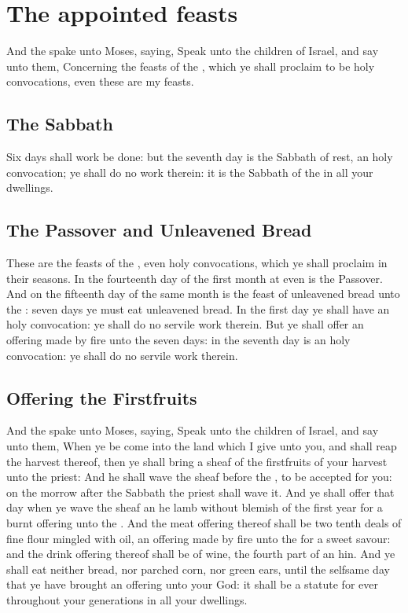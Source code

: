 \section*{The appointed feasts}
\begin{biblechapter} %
\verse And the \LORD spake unto Moses, saying,
\verse Speak unto the children of Israel, and say unto them, Concerning the feasts of the \LORD, which ye shall proclaim to be holy convocations, even these are my feasts.
\subsection*{The Sabbath}
\verse Six days shall work be done: but the seventh day is the Sabbath of rest, an holy convocation; ye shall do no work therein: it is the Sabbath of the \LORD in all your dwellings.
\subsection*{The Passover and Unleavened Bread}
\verse These are the feasts of the \LORD, even holy convocations, which ye shall proclaim in their seasons.
\verse In the fourteenth day of the first month at even is the \LORDs Passover.
\verse And on the fifteenth day of the same month is the feast of unleavened bread unto the \LORD: seven days ye must eat unleavened bread.
\verse In the first day ye shall have an holy convocation: ye shall do no servile work therein.
\verse But ye shall offer an offering made by fire unto the \LORD seven days: in the seventh day is an holy convocation: ye shall do no servile work therein.
\subsection*{Offering the Firstfruits}
\verse And the \LORD spake unto Moses, saying,
\verse Speak unto the children of Israel, and say unto them, When ye be come into the land which I give unto you, and shall reap the harvest thereof, then ye shall bring a sheaf of the firstfruits of your harvest unto the priest:
\verse And he shall wave the sheaf before the \LORD, to be accepted for you: on the morrow after the Sabbath the priest shall wave it.
\verse And ye shall offer that day when ye wave the sheaf an he lamb without blemish of the first year for a burnt offering unto the \LORD.
\verse And the meat offering thereof shall be two tenth deals of fine flour mingled with oil, an offering made by fire unto the \LORD for a sweet savour: and the drink offering thereof shall be of wine, the fourth part of an hin.
\verse And ye shall eat neither bread, nor parched corn, nor green ears, until the selfsame day that ye have brought an offering unto your God: it shall be a statute for ever throughout your generations in all your dwellings.

\end{biblechapter}
